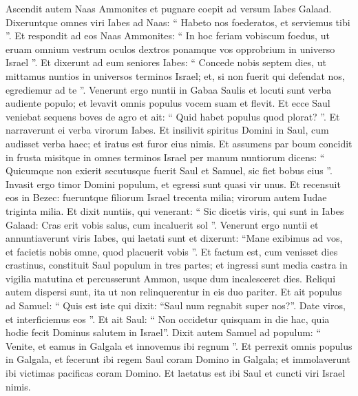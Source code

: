 \begin{biblechapter}
\begin{biblechapter}
\begin{biblechapter}
\begin{biblechapter}
\begin{biblechapter}
\begin{biblechapter}
\begin{biblechapter}
\begin{biblechapter}
\begin{biblechapter}
\begin{biblechapter}
\begin{biblechapter}
\verse Ascendit autem Naas Ammonites et pugnare coepit ad versum Iabes Galaad. Dixeruntque omnes viri Iabes ad Naas: “ Habeto nos foederatos, et serviemus tibi ”. 
\verse Et respondit ad eos Naas Ammonites: “ In hoc feriam vobiscum foedus, ut eruam omnium vestrum oculos dextros ponamque vos opprobrium in universo Israel ”. 
\verse Et dixerunt ad eum seniores Iabes: “ Concede nobis septem dies, ut mittamus nuntios in universos terminos Israel; et, si non fuerit qui defendat nos, egrediemur ad te ”. 
\verse Venerunt ergo nuntii in Gabaa Saulis et locuti sunt verba audiente populo; et levavit omnis populus vocem suam et flevit.
 \verse Et ecce Saul veniebat sequens boves de agro et ait: “ Quid habet populus quod plorat? ”. Et narraverunt ei verba virorum Iabes. 
\verse Et insilivit spiritus Domini in Saul, cum audisset verba haec; et iratus est furor eius nimis. 
\verse Et assumens par boum concidit in frusta misitque in omnes terminos Israel per manum nuntiorum dicens: “ Quicumque non exierit secutusque fuerit Saul et Samuel, sic fiet bobus eius ”. Invasit ergo timor Domini populum, et egressi sunt quasi vir unus. 
\verse Et recensuit eos in Bezec: fueruntque filiorum Israel trecenta milia; virorum autem Iudae triginta milia. 
\verse Et dixit nuntiis, qui venerant: “ Sic dicetis viris, qui sunt in Iabes Galaad: Cras erit vobis salus, cum incaluerit sol ”. Venerunt ergo nuntii et annuntiaverunt viris Iabes, qui laetati sunt 
\verse et dixerunt: “Mane exibimus ad vos, et facietis nobis omne, quod placuerit vobis ”.
 \verse Et factum est, cum venisset dies crastinus, constituit Saul populum in tres partes; et ingressi sunt media castra in vigilia matutina et percusserunt Ammon, usque dum incalesceret dies. Reliqui autem dispersi sunt, ita ut non relinquerentur in eis duo pariter.
 \verse Et ait populus ad Samuel: “ Quis est iste qui dixit: “Saul num regnabit super nos?”. Date viros, et interficiemus eos ”. 
\verse Et ait Saul: “ Non occidetur quisquam in die hac, quia hodie fecit Dominus salutem in Israel”. 
\verse Dixit autem Samuel ad populum: “ Venite, et eamus in Galgala et innovemus ibi regnum ”.
 \verse Et perrexit omnis populus in Galgala, et fecerunt ibi regem Saul coram Domino in Galgala; et immolaverunt ibi victimas pacificas coram Domino. Et laetatus est ibi Saul et cuncti viri Israel nimis.
 

\end{biblechapter}
\end{biblechapter}
\end{biblechapter}
\end{biblechapter}
\end{biblechapter}
\end{biblechapter}
\end{biblechapter}
\end{biblechapter}
\end{biblechapter}
\end{biblechapter}
\end{biblechapter}
